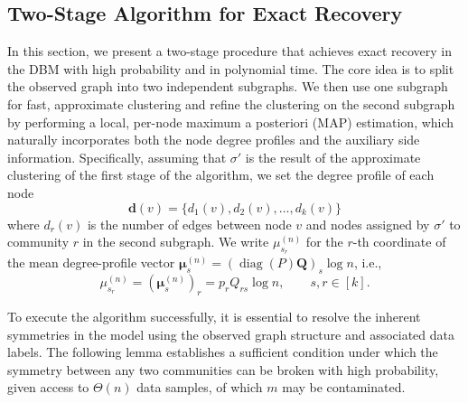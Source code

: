 \documentclass[11pt]{article}
\theoremstyle{plain}
\theoremstyle{definition}
\DeclareMathOperator{\diag}{diag}
\begin{document}
\subsection{Two-Stage Algorithm for Exact Recovery}
In this section, we present a two-stage procedure that achieves exact recovery in the DBM with high probability and in polynomial time. The core idea is to split the observed graph into two independent subgraphs. We then use one subgraph for fast, approximate clustering and refine the clustering on the second subgraph by performing a local, per-node maximum a posteriori (MAP) estimation, which naturally incorporates both the node degree profiles and the auxiliary side information. 
Specifically, assuming that $\sigma'$ is the result of the approximate
clustering of the first stage of the algorithm, we set the degree profile
of each node
\[
\mathbf{d}(v) = \{d_1(v), d_2(v), \ldots , d_k(v) \}
\]
where $d_r(v)$ is the number of edges between node $v$ and nodes assigned by $\sigma'$ to community $r$ in the second subgraph.
We write $\mu_{s_r}^{(n)}$ for the $r$-th coordinate of the mean degree-profile vector
$\bm{\mu}_s^{(n)} = (\diag(P)\mathbf{Q})_s \log n$, i.e.,
\[
\mu_{s_r}^{(n)} = (\bm{\mu}_s^{(n)})_r = p_r Q_{rs}\log n,\qquad s,r\in[k].
\]

To execute the algorithm successfully, it is essential to resolve the inherent symmetries in the model using the observed graph structure and associated data labels. The following lemma establishes a sufficient condition under which the symmetry between any two communities can be broken with high probability, given access to $\Theta(n)$ data samples, of which $m$ may be contaminated.
\end{document}
